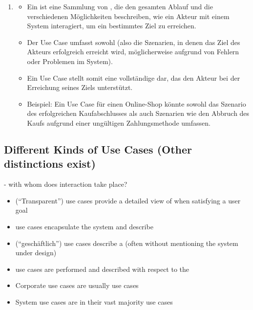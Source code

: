 \begin{infoBox}
\begin{enumerate}
\begin{itemize}
        \end{itemize}
        \item {}
        \begin{itemize}
            \item Ein  ist eine Sammlung von , die den gesamten Ablauf und die verschiedenen Möglichkeiten beschreiben, wie ein Akteur mit einem System interagiert, um ein bestimmtes Ziel zu erreichen.
            \item Der Use Case umfasst sowohl  (also die Szenarien, in denen das Ziel des Akteurs erfolgreich erreicht wird, möglicherweise aufgrund von Fehlern oder Problemen im System).
            \item Ein Use Case stellt somit eine vollständige  dar, das den Akteur bei der Erreichung seines Ziels unterstützt.
            \item Beispiel: Ein Use Case für einen Online-Shop könnte sowohl das Szenario des erfolgreichen Kaufabschlusses als auch Szenarien wie den Abbruch des Kaufs aufgrund einer ungültigen Zahlungsmethode umfassen.
        \end{itemize}
    \end{enumerate}
\end{infoBox}

\subsection{Different Kinds of Use Cases (Other distinctions exist)}
 - with whom does interaction take place?
\begin{itemize}
    \item {} (\enquote{Transparent}) use cases provide a detailed view of  when satisfying a user goal
    \item {} use cases encapsulate the system and describe 
\end{itemize}
\begin{itemize}
    \item {} (\enquote{geschäftlich}) use cases describe a  (often without mentioning the system under design)
    \item {} use cases are performed and described with respect to the 
\end{itemize}
\begin{defBox}[title=Defaults]
    \begin{itemize}
        \item Corporate use cases are usually  use cases 
        \item System use cases are in their vast majority  use cases
    \end{itemize}
\end{defBox}

